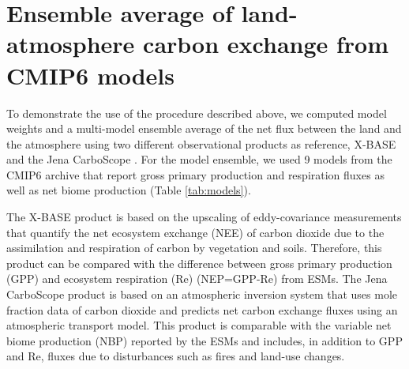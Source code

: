 \documentclass[gmd, manuscript]{copernicus}
\begin{document}
\section{Ensemble average of land-atmosphere carbon exchange from CMIP6 models}
To demonstrate the use of the procedure described above, we computed model weights and a multi-model ensemble average of the net flux between the land and the atmosphere using two different observational products as reference, X-BASE \citep{Nelson2024} and the Jena CarboScope \citep{Rodenbeck2005}. For the model ensemble, we used 9 models from the CMIP6 archive that report gross primary production and respiration fluxes as well as net biome production (Table \ref{tab:models}).

The X-BASE product is based on the upscaling of eddy-covariance measurements that quantify the net ecosystem exchange (NEE) of carbon dioxide due to the assimilation and respiration of carbon by vegetation and soils. Therefore, this product can be compared with the difference between gross primary production (GPP) and ecosystem respiration (Re) (NEP=GPP-Re) from ESMs. The Jena CarboScope product is based on an atmospheric inversion system that uses mole fraction data of carbon dioxide and predicts net carbon exchange fluxes using an atmospheric transport model. This product is comparable with the variable net biome production (NBP) reported by the ESMs and includes, in addition to GPP and Re, fluxes due to disturbances such as fires and land-use changes. 
\end{document}
